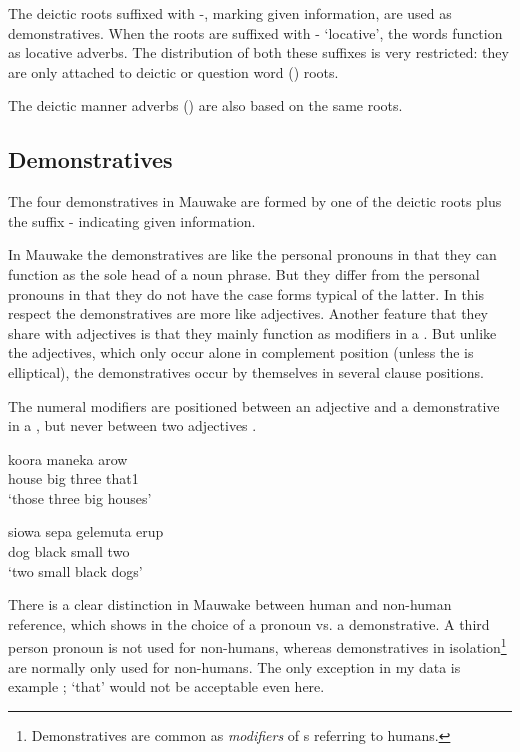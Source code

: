 The deictic roots suffixed with -, marking given information, are used as demonstratives. When the roots are suffixed with - `locative', the words function as locative adverbs. The distribution of both these suffixes is very restricted: they are only attached to deictic or question word () roots.

The deictic manner adverbs () are also based on the same roots.

\subsection{Demonstratives}\label{sec:3.6.2}
{}
The four demonstratives in Mauwake are formed by one of the deictic roots plus the suffix - indicating given information. 

In Mauwake the demonstratives are like the personal pronouns in that they can function as the sole head of a noun phrase. But they differ from the personal pronouns in that they do not have the case forms typical of the latter. In this respect the demonstratives are more like adjectives. Another feature that they share with adjectives is that they mainly function as modifiers in a . But unlike the adjectives, which only occur alone in complement position (unless the  is elliptical), the demonstratives occur by themselves in several clause positions. 

The numeral modifiers are positioned between an adjective and a demonstrative in a  , but never between two adjectives .

\ea%
\label{ex:3:x631}
\gll koora maneka arow  \\
house big three that1\\
\glt`those three big houses'
\z

\ea%
\label{ex:3:x632}
\gll siowa sepa gelemuta erup \\
dog black small two\\
\glt`two small black dogs'
\z

There is a clear distinction in Mauwake between human and non-human reference, which shows in the choice of a pronoun vs. a demonstrative. A third person pronoun is not used for non-humans, whereas demonstratives in isolation\footnote{Demonstratives are common as \textit{modifiers} of s referring to humans.} are normally only used for non-humans. The only exception in my data is example ;  `that' would not be acceptable even here.

